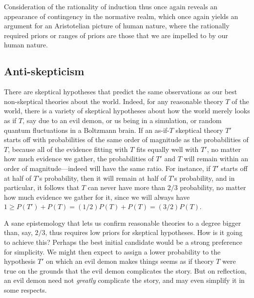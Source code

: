 Consideration of the rationality of induction thus once again reveals an appearance of contingency in the normative realm, which
once again yields an argument for an Aristotelian picture of human nature, where the rationally required priors or ranges of priors
are those that we are impelled to by our human nature.

\subsection{Anti-skepticism}
There are skeptical hypotheses that predict the same observations as our best non-skeptical theories
about the world. Indeed, for any reasonable theory $T$ of the world, there is a variety of skeptical hypotheses about
how the world merely looks as if $T$, say due to an evil demon, or us being in a simulation, or random quantum 
fluctuations in a Boltzmann brain. If an as-if-$T$ skeptical theory $T'$ starts off with probabilities of the same
order of magnitude as the probabilities of $T$, because all of the evidence fitting with $T$ fits equally well with $T'$, 
no matter how much evidence we gather, the probabilities of $T'$ and $T$ will remain within an order of magnitude---indeed will have the same
ratio. For instance, if
$T'$ starts off at half of $T$'s probability, then it will remain at half of $T$'s probability, and in particular, 
it follows that $T$ can never have more than $2/3$ probability, no matter how much evidence we gather for it,
since we will always have $1 \ge P(T')+P(T) = (1/2)P(T)+P(T) = (3/2)P(T)$. 

A sane epistemology that lets us confirm reasonable theories to a degree bigger than, say, $2/3$, thus requires low 
priors for skeptical hypotheses. How is it going to achieve this?
Perhaps the best initial candidate would be a strong preference for simplicity. We might then expect to assign a lower probability to the hypothesis $T'$ 
on which an evil demon makes things seems as if theory $T$ were true on the grounds that the evil demon complicates 
the story. But on reflection, an evil demon need not \textit{greatly} complicate the story, and may even simplify it 
in some respects.


